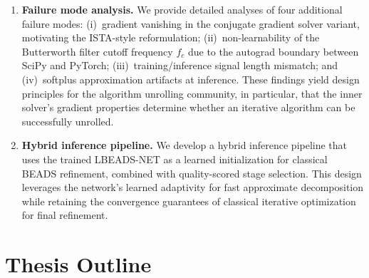 \begin{enumerate}
    \item \textbf{Failure mode analysis.} We provide detailed analyses of four additional failure modes: (i)~gradient vanishing in the conjugate gradient solver variant, motivating the ISTA-style reformulation; (ii)~non-learnability of the Butterworth filter cutoff frequency $f_c$ due to the autograd boundary between SciPy and PyTorch; (iii)~training/inference signal length mismatch; and (iv)~softplus approximation artifacts at inference. These findings yield design principles for the algorithm unrolling community, in particular, that the inner solver's gradient properties determine whether an iterative algorithm can be successfully unrolled.

    \item \textbf{Hybrid inference pipeline.} We develop a hybrid inference pipeline that uses the trained LBEADS-NET as a learned initialization for classical BEADS refinement, combined with quality-scored stage selection. This design leverages the network's learned adaptivity for fast approximate decomposition while retaining the convergence guarantees of classical iterative optimization for final refinement.
\end{enumerate}


\section{Thesis Outline}
\label{sec:intro_outline}

